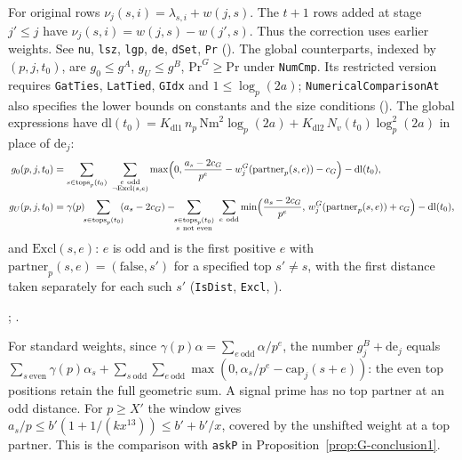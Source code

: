 \begin{definition}
\[\]
For original rows $\nu_j(s,i)=\lambda_{s,i}+w(j,s)$. The $t+1$ rows added at stage $j'\le j$ have
$\nu_j(s,i)=w(j,s)-w(j',s)$. Thus the correction uses earlier weights. See
\texttt{nu}, \texttt{lsz}, \texttt{lgp}, \texttt{de}, \texttt{dSet}, \texttt{Pr}
().
The global counterparts, indexed by $(p,j,t_0)$, are $g_0\le g^A$, $g_U\le g^B$, $\mathrm{Pr}^{G}\ge\mathrm{Pr}$
under \texttt{NumCmp}. Its restricted version requires \texttt{GatTies}, \texttt{LatTied},
\texttt{GIdx} and $1\le\log_p(2a)$; \texttt{NumericalComparisonAt} also specifies the lower bounds on constants and the size conditions (). The global expressions have
$\mathrm{dl}(t_0)=K_{\mathrm{dl}1}\,n_p\,\mathrm{Nm}^{2}\log_p(2a)+K_{\mathrm{dl}2}\,N_v(t_0)\log_p^{2}(2a)$ in place of
$\mathrm{de}_j$:
\[
\begin{aligned}
 g_0(p,j,t_0)&=\sum_{s\in\mathrm{tops}_p(t_0)}\ \sum_{\substack{e\ \mathrm{odd}\\ \neg\mathrm{Excl}(s,e)}}
   \max\Bigl(0,\frac{a_s-2c_G}{p^{e}}-w_j^{G}(\mathrm{partner}_p(s,e))-c_G\Bigr)-\mathrm{dl}(t_0),\\
 g_U(p,j,t_0)&=\gamma(p)\!\!\sum_{s\in\mathrm{tops}_p(t_0)}\!\!(a_s-2c_G)
   -\!\!\sum_{\substack{s\in\mathrm{tops}_p(t_0)\\ s\ \text{not even}}}\ \sum_{e\ \mathrm{odd}}
   \min\Bigl(\frac{a_s-2c_G}{p^{e}},\,w_j^{G}(\mathrm{partner}_p(s,e))+c_G\Bigr)-\mathrm{dl}(t_0),
\end{aligned}
\]
and $\mathrm{Excl}(s,e)$: $e$ is odd and is the first positive $e$ with $\mathrm{partner}_p(s,e)=(\mathrm{false},s')$
for a specified top $s'\ne s$, with the first distance taken separately for each such $s'$ (\texttt{IsDist}, \texttt{Excl}, ).
\par{\small {}; .}\par
\end{definition}

For standard weights, since $\gamma(p)\alpha=\sum_{e\ \mathrm{odd}}\alpha/p^{e}$, the number $g^{B}_j+\mathrm{de}_j$ equals
$\sum_{s\ \mathrm{even}}\gamma(p)\alpha_s+\sum_{s\ \mathrm{odd}}\sum_{e\ \mathrm{odd}}\max(0,\alpha_s/p^{e}-\mathrm{cap}_j(s+e))$:
the even top positions retain the full geometric sum. A signal prime has no top partner at an odd distance.
For $p\ge X'$ the window gives $a_s/p\le b'(1+1/(kx^{13}))\le b'+b'/x$, covered by
the unshifted weight at a top partner. This is the comparison with \texttt{askP} in Proposition~\ref{prop:G-conclusion1}.

